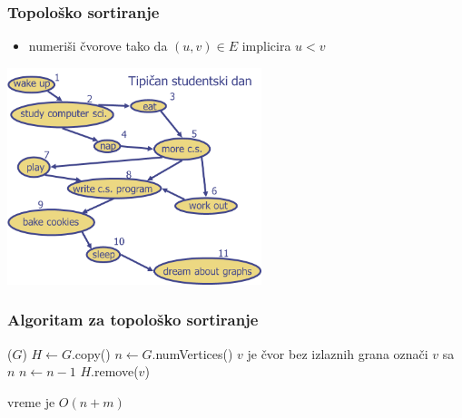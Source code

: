 \documentclass[compress,aspectratio=169]{beamer}
\renewcommand{\algorithmiccomment}[1]{\hfill \{\myred{#1}\}}
\begin{document}
\begin{frame}[fragile]
  \frametitle{Topološko sortiranje}
  \begin{itemize}
    \item numeriši čvorove tako da $(u,v) \in E$ implicira $u<v$ 
  \end{itemize}
  \begin{center}
    \includegraphics[width=7.4cm]{asp-14-pic47.png}
  \end{center}
\end{frame}

\begin{frame}[fragile]
  \frametitle{Algoritam za topološko sortiranje}
  \begin{algorithmic}
    \STATE {}($G$)
    \STATE $H \leftarrow G$.copy()
    \STATE $n \leftarrow G$.numVertices()
      \STATE $v$ je čvor bez izlaznih grana
      \STATE označi $v$ sa $n$
      \STATE $n \leftarrow n-1$
      \STATE $H$.remove($v$)
    \ENDWHILE
  \end{algorithmic}
  \hfill vreme je $O(n+m)$
\end{frame}

\renewcommand{\algorithmiccomment}[1]{\{\myred{#1}\}}
\end{document}
